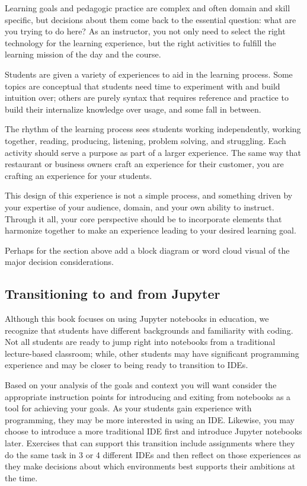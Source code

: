 \documentclass[]{book}
\begin{document}
Learning goals and pedagogic practice are complex and often domain and skill
specific, but decisions about them come back to the essential question: what are
you trying to do here? As an instructor, you not only need to select the right
technology for the learning experience, but the right activities to fulfill the
learning mission of the day and the course.

Students are given a variety of experiences to aid in the learning process. Some
topics are conceptual that students need time to experiment with and build
intuition over; others are purely syntax that requires reference and practice to
build their internalize knowledge over usage, and some fall in between.

The rhythm of the learning process sees students working independently, working
together, reading, producing, listening, problem solving, and struggling. Each
activity should serve a purpose as part of a larger experience. The same way
that restaurant or business owners craft an experience for their customer, you
are crafting an experience for your students.

This design of this experience is not a simple process, and something driven by
your expertise of your audience, domain, and your own ability to instruct.
Through it all, your core perspective should be to incorporate elements that
harmonize together to make an experience leading to your desired learning goal.

Perhaps for the section above add a block diagram or word cloud visual of the
major decision considerations.

\hypertarget{transitioning-to-and-from-jupyter}{%
\subsection{Transitioning to and from Jupyter}\label{transitioning-to-and-from-jupyter}}

Although this book focuses on using Jupyter notebooks in education, we recognize
that students have different backgrounds and familiarity with coding. Not all
students are ready to jump right into notebooks from a traditional lecture-based
classroom; while, other students may have significant programming experience and
may be closer to being ready to transition to IDEs.

Based on your analysis of the goals and context you will want consider the
appropriate instruction points for introducing and exiting from notebooks as a
tool for achieving your goals. As your students gain experience with
programming, they may be more interested in using an IDE. Likewise, you may
choose to introduce a more traditional IDE first and introduce Jupyter notebooks
later. Exercises that can support this transition include assignments where they
do the same task in 3 or 4 different IDEs and then reflect on those experiences
as they make decisions about which environments best supports their ambitions at
the time.
\end{document}
